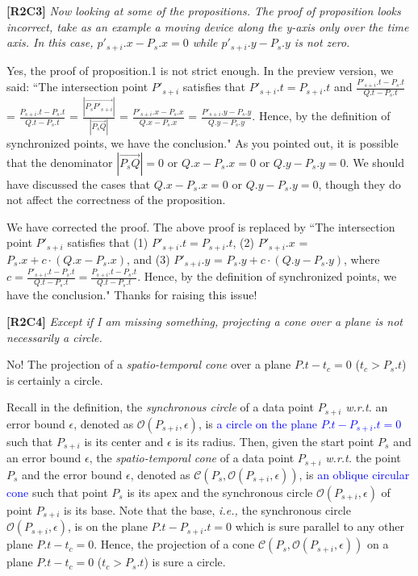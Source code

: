 \documentclass{letter}
\newcommand{\ie}{\emph{i.e.,}\xspace}
\newcommand{\wrt}{\emph{w.r.t.}\xspace}
\newcommand{\cone}[1]{{$\mathcal{C}{#1}$}}
\renewcommand{\circle}[1]{{$\mathcal{O}{#1}$}}
\begin{document}
\textbf{[R2C3]} \emph{Now looking at some of the propositions.
The proof of proposition looks incorrect, take as an example a moving device along the y-axis only over the time axis. In this case, $p'_{s+i}.x - P_s.x = 0$ while $p'_{s+i}.y - P_s.y$ is not zero.
}

Yes, the proof of proposition.1 is not strict enough. In the preview version, we said:
``The intersection point $P'_{s+i}$ satisfies that $P'_{s+i}.t = P_{s+i}.t$ and
$\frac{P'_{s+i}.t - P_{s}.t}{Q.t - P_{s}.t}$ = $\frac{P_{s+i}.t - P_{s}.t}{Q.t - P_{s}.t}$  =
$\frac{|\overrightarrow{P_sP'_{s+i}}|}{|\overrightarrow{P_sQ}|}$ =
$\frac{P'_{s+i}.x - P_{s}.x}{Q.x - P_{s}.x}$ =
$\frac{P'_{s+i}.y - P_{s}.y}{Q.y - P_{s}.y}$.
Hence, by the definition of synchronized points, we have the conclusion."
As you pointed out, it is possible that the denominator $|\overrightarrow{P_sQ}|=0$ or $Q.x - P_{s}.x=0$ or $Q.y - P_{s}.y=0$. We should have discussed the cases that $Q.x - P_{s}.x=0$ or $Q.y - P_{s}.y=0$, though they do not affect the correctness of the proposition.

We have corrected the proof. The above proof is replaced by
``The intersection point $P'_{s+i}$ satisfies that
(1) $P'_{s+i}.t = P_{s+i}.t$,
(2) $P'_{s+i}.x$ = $P_s.x +  c\cdot(Q.x - P_s.x)$, and
(3) $P'_{s+i}.y$ = $P_s.y +  c\cdot(Q.y - P_s.y)$,
where $c= \frac{P'_{s+i}.t - P_{s}.t}{Q.t - P_{s}.t}= \frac{P_{s+i}.t-P_s.t}{Q.t-P_s.t}$.
Hence, by the definition of synchronized points, we have the conclusion."
Thanks for raising this issue!


\textbf{[R2C4]} \emph{Except if I am missing something, projecting a cone over a plane is not necessarily a circle.}

No! The projection of a \emph{spatio-temporal cone} over a plane $P.t- t_c = 0$ ($t_c > P_s.t$) is certainly a circle.

Recall in the definition, the \emph{synchronous circle} of a data point $P_{s+i}$ \wrt an error bound $\epsilon$, denoted as \circle{(P_{s+i}, \epsilon)}, is \textcolor{blue}{a circle on the plane $P.t-P_{s+i}.t = 0$} such that $P_{s+i}$ is its center and $\epsilon$ is its radius.
%
Then, given the start point $P_s$ and an error bound $\epsilon$, the \emph{spatio-temporal cone} of a data point $P_{s+i}$ \wrt the point $P_s$ and the error bound $\epsilon$, denoted as \cone{(P_s, \mathcal{O}(P_{s+i}, \epsilon))}, is \textcolor{blue}{an oblique circular cone} such that point $P_s$ is its apex and the synchronous circle $\mathcal{O}(P_{s+i}, \epsilon)$ of point $P_{s+i}$ is its base. Note that the base, \ie the synchronous circle $\mathcal{O}(P_{s+i}, \epsilon)$, is on the plane $P.t-P_{s+i}.t = 0$ which is sure parallel to any other plane $P.t- t_c = 0$. Hence, the  projection of a cone \cone{(P_s, \mathcal{O}(P_{s+i}, \epsilon))} on a plane $P.t- t_c = 0$ ($t_c > P_s.t$) is sure a circle.
\end{document}
